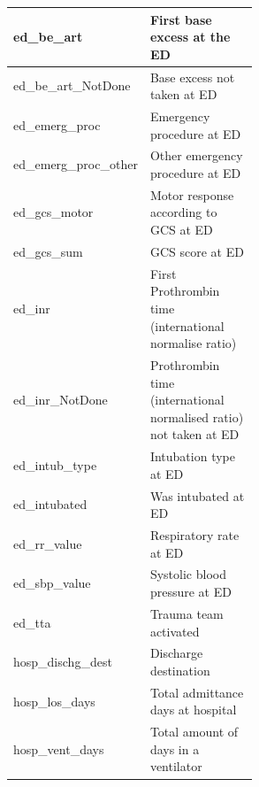 \documentclass[12pt, a4paper]{article}
\begin{document}
\begin{appendices}
\begin{longtable}[c]{@{}|l|p{0.55\linewidth}|@{}}
        ed\_be\_art                                 & First base excess at the ED                                       \\\hline
        ed\_be\_art\_NotDone                        & Base excess not taken at ED                                       \\\hline
        ed\_emerg\_proc                             & Emergency procedure at ED                                         \\\hline
        ed\_emerg\_proc\_other                      & Other emergency procedure at ED                                   \\\hline
        ed\_gcs\_motor                              & Motor response according to GCS at ED                             \\\hline
        ed\_gcs\_sum                                & GCS score at ED                                                   \\\hline
        ed\_inr                                     & First Prothrombin time (international normalise ratio)            \\\hline
        ed\_inr\_NotDone                            & Prothrombin time (international normalised ratio) not taken at ED \\\hline
        ed\_intub\_type                             & Intubation type at ED                                             \\\hline
        ed\_intubated                               & Was intubated at ED                                               \\\hline
        ed\_rr\_value                               & Respiratory rate at ED                                            \\\hline
        ed\_sbp\_value                              & Systolic blood pressure at ED                                     \\\hline
        ed\_tta                                     & Trauma team activated                                             \\\hline
        hosp\_dischg\_dest                          & Discharge destination                                             \\\hline
        hosp\_los\_days                             & Total admittance days at hospital                                 \\\hline
        hosp\_vent\_days                            & Total amount of days in a ventilator                              \\\hline

\end{longtable}
\end{appendices}
\end{document}
